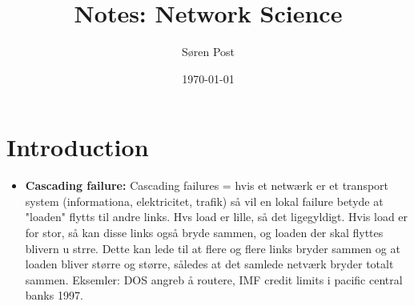 \documentclass[11pt]{article}
\author{Søren Post}
\date{\today}
\title{Notes: Network Science}
\begin{document}
\maketitle
\newpage

\section{Introduction}
\label{sec:orgaba2d05}

\begin{itemize}
\item \textbf{Cascading failure:} Cascading failures = hvis et netwærk er et transport system (informationa, elektricitet, trafik) så vil en lokal failure betyde at "loaden" flytts til andre links. Hvs load er lille, så det ligegyldigt. Hvis load er for stor, så kan disse links også bryde sammen, og loaden der skal flyttes blivern u strre. Dette kan lede til at flere og flere links bryder sammen og at loaden bliver større og større, således at det samlede netværk bryder totalt sammen. Eksemler: DOS angreb å routere, IMF credit limits i pacific central banks 1997.
\end{itemize}
\end{document}
